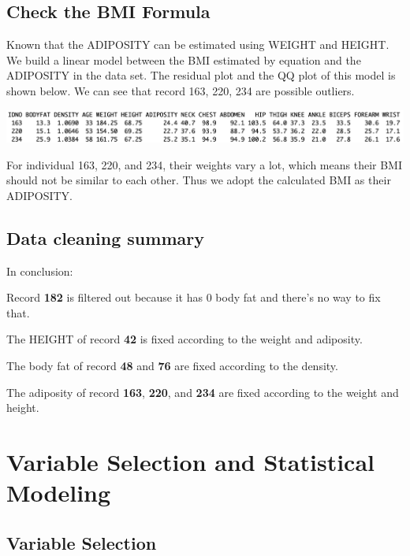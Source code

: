 \documentclass[11pt]{article}
\makeatletter
\def\maxwidth{\ifdim\Gin@nat@width>\linewidth\linewidth
    \else\Gin@nat@width\fi}
\let\Oldincludegraphics\includegraphics
\renewcommand{\includegraphics}[1]{\Oldincludegraphics[width=.8\maxwidth]{#1}}
\makeatother
\begin{document}
    \hypertarget{check-the-bmi-formula}{%
\subsection{Check the BMI Formula}\label{check-the-bmi-formula}}

Known that the ADIPOSITY can be estimated using WEIGHT and HEIGHT. We
build a linear model between the BMI estimated by equation and the
ADIPOSITY in the data set. The residual plot and the QQ plot of this
model is shown below. We can see that record 163, 220, 234 are possible
outliers.

\includegraphics{plots/data3_1.png}

    For individual 163, 220, and 234, their weights vary a lot, which means
their BMI should not be similar to each other. Thus we adopt the
calculated BMI as their ADIPOSITY.

    \hypertarget{data-cleaning-summary}{%
\subsection{Data cleaning summary}\label{data-cleaning-summary}}

In conclusion:

Record \textbf{182} is filtered out because it has 0 body fat and
there's no way to fix that.

The HEIGHT of record \textbf{42} is fixed according to the weight and
adiposity.

The body fat of record \textbf{48} and \textbf{76} are fixed according
to the density.

The adiposity of record \textbf{163}, \textbf{220}, and \textbf{234} are
fixed according to the weight and height.

    \hypertarget{variable-selection-and-statistical-modeling}{%
\section{Variable Selection and Statistical
Modeling}\label{variable-selection-and-statistical-modeling}}

\hypertarget{variable-selection}{%
\subsection{Variable Selection}\label{variable-selection}}
\end{document}
